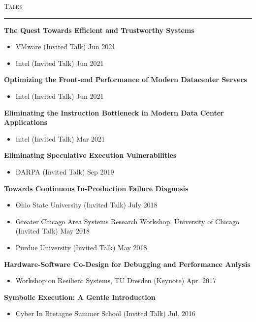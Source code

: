 \documentclass[10pt]{article}
\newcommand{\mysec}[1]{\vspace{2em}\textsc{\large #1}\vspace{1mm}\hrule\vspace{2mm}}
\newcommand{\mysub}[3]{\textbf{#1} {#2} \hfill {\em #3}}
\begin{document}
\mysec{Talks}
\mysub{The Quest Towards Efficient and Trustworthy Systems}{}{}
\vspace{-2mm}
\begin{itemize}
  \setlength\itemsep{0em}
\item{VMware (Invited Talk)} \hfill Jun 2021
\item{Intel (Invited Talk)} \hfill Jun 2021
\end{itemize}
\mysub{Optimizing the Front-end Performance of Modern Datacenter Servers}{}{}
\vspace{-2mm}
\begin{itemize}
  \setlength\itemsep{0em}
\item{Intel (Invited Talk)} \hfill Jun 2021
\end{itemize}
\mysub{Eliminating the Instruction Bottleneck in Modern Data Center Applications}{}{}
\vspace{-2mm}
\begin{itemize}
  \setlength\itemsep{0em}
\item{Intel (Invited Talk)} \hfill Mar 2021
\end{itemize}
\mysub{Eliminating Speculative Execution Vulnerabilities}{}{}
\vspace{-2mm}
\begin{itemize}
  \setlength\itemsep{0em}
\item{DARPA (Invited Talk)} \hfill Sep 2019
\end{itemize}
\mysub{Towards Continuous In-Production Failure Diagnosis}{}{}
\vspace{-2mm}
\begin{itemize}
  \setlength\itemsep{0em}
\item{Ohio State University (Invited Talk)} \hfill July 2018
\item{Greater Chicago Area Systems Research Workshop, University of Chicago (Invited Talk)} \hfill May 2018
\item{Purdue University (Invited Talk)} \hfill May 2018
\end{itemize}
\mysub{Hardware-Software Co-Design for Debugging and Performance Anlysis}{}{}
\vspace{-2mm}
\begin{itemize}
  \setlength\itemsep{0em}
  \item{Workshop on Resilient Systems, TU Dresden (Keynote)} \hfill Apr. 2017
\end{itemize}
\mysub{Symbolic Execution: A Gentle Introduction}{}{}
\vspace{-2mm}
\begin{itemize}
  \setlength\itemsep{0em}
  \item{Cyber In Bretagne Summer School (Invited Talk)} \hfill Jul. 2016
\end{itemize}
\end{document}
